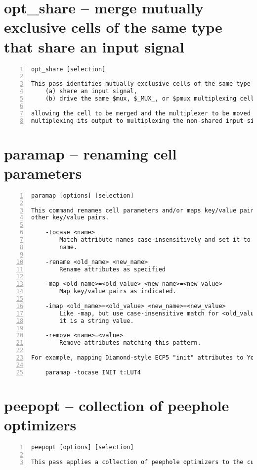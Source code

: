 \section{opt\_share -- merge mutually exclusive cells of the same type that share an input signal}
\label{cmd:opt_share}
\begin{lstlisting}[numbers=left,frame=single]
    opt_share [selection]

This pass identifies mutually exclusive cells of the same type that:
    (a) share an input signal,
    (b) drive the same $mux, $_MUX_, or $pmux multiplexing cell,

allowing the cell to be merged and the multiplexer to be moved from
multiplexing its output to multiplexing the non-shared input signals.
\end{lstlisting}

\section{paramap -- renaming cell parameters}
\label{cmd:paramap}
\begin{lstlisting}[numbers=left,frame=single]
    paramap [options] [selection]

This command renames cell parameters and/or maps key/value pairs to
other key/value pairs.

    -tocase <name>
        Match attribute names case-insensitively and set it to the specified
        name.

    -rename <old_name> <new_name>
        Rename attributes as specified

    -map <old_name>=<old_value> <new_name>=<new_value>
        Map key/value pairs as indicated.

    -imap <old_name>=<old_value> <new_name>=<new_value>
        Like -map, but use case-insensitive match for <old_value> when
        it is a string value.

    -remove <name>=<value>
        Remove attributes matching this pattern.

For example, mapping Diamond-style ECP5 "init" attributes to Yosys-style:

    paramap -tocase INIT t:LUT4
\end{lstlisting}

\section{peepopt -- collection of peephole optimizers}
\label{cmd:peepopt}
\begin{lstlisting}[numbers=left,frame=single]
    peepopt [options] [selection]

This pass applies a collection of peephole optimizers to the current design.
\end{lstlisting}

